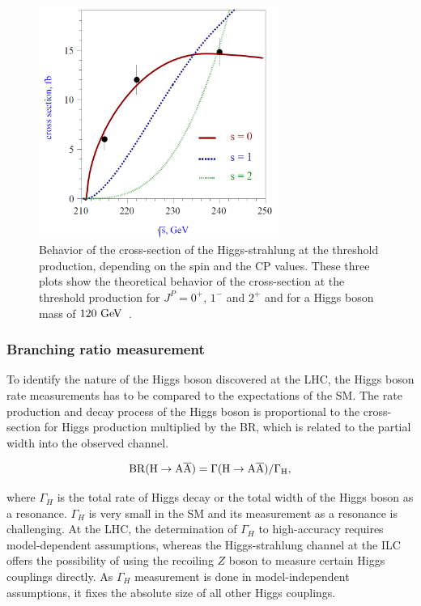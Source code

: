     \begin{figure}[!tbh]
      \centering
      \includegraphics[width = 0.7\textwidth]{Pictures/Higgs/spin.jpg}
      \caption{Behavior of the cross-section of the Higgs-strahlung at the threshold production, depending on the spin and the CP values. These three plots show the theoretical behavior of the cross-section at the threshold production for $J^{P} = 0^+$, $1^-$ and $2^+$ and for a Higgs boson mass of $120~\rm{GeV}$~\cite{Dova2003}.}
      \label{fig:spin}
    \end{figure}

    \subsubsection{Branching ratio measurement}

    To identify the nature of the Higgs boson discovered at the \gls{LHC}, the Higgs boson rate measurements has to be compared to the expectations of the \gls{SM}.
    The rate production and decay process of the Higgs boson is proportional to the cross-section for Higgs production multiplied by the \gls{BR}, which is related to the partial width into the observed channel.

    \begin{equation}
      \rm{BR}(H \rightarrow A\overline{A}) = \Gamma(H \rightarrow A\overline{A})/\Gamma_H, 
    \end{equation}
    
    where $\Gamma_H$ is the total rate of Higgs decay or the total width of the Higgs boson as a resonance.
    $\Gamma_H$ is very small in the \gls{SM} and its measurement as a resonance is challenging.
    At the \gls{LHC}, the determination of $\Gamma_H$ to high-accuracy requires model-dependent assumptions, whereas the Higgs-strahlung channel at the \gls{ILC} offers the possibility of using the recoiling $Z$ boson to measure certain Higgs couplings directly.
    As $\Gamma_H$ measurement is done in model-independent assumptions, it fixes the absolute size of all other Higgs couplings.

